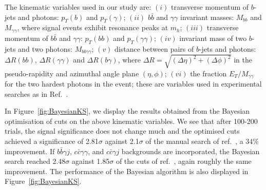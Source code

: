
%


The  kinematic variables used in our  study are:
$(i)$ transverse momentum of $b$-jets and photons: $p_T(b)$ and $p_T(\gamma)$; 
$(ii)$ $b\bar{b}$ and $\gamma\gamma$ invariant masses: $M_{bb}$ and $M_{\gamma\gamma}$, where signal events exhibit resonance peaks at $m_h$;
$(iii)$ transverse momentum of $b\bar{b}$ and $\gamma\gamma$: $p_T(bb)$ and $p_T(\gamma\gamma)$; 
$(iv)$ invariant mass of two $b$-jets and two photons: $M_{bb\gamma\gamma}$;
$(v)$ distance between pairs of $b$-jets and photons: $\Delta R(bb)$, $\Delta R(\gamma\gamma)$ and $\Delta R(b\gamma)$, where
$\Delta R=\sqrt{(\Delta\eta)^2+(\Delta\phi)^2}$ in the pseudo-rapidity and azimuthal angle plane $(\eta,\phi)$;
$(vi)$ the fraction $E_T/M_{\gamma\gamma}$ for the two hardest photons in the event; these are variables used in experimental searches as in Ref.~\cite{Aad:2014yja, CMS}.

In Figure~\ref{fig:BayesianKS}, we display the results obtained from the Bayesian optimisation of cuts on the above kinematic variables. We see that after 100-200 trials, the signal significance does not change much and the optimised cuts achieved a significance of 2.81$\sigma$ against 2.1$\sigma$ of the manual search of ref.~\cite{Azatov:2015oxa}, a 34\% improvement. If $b\bar{b}\gamma j$, $c\bar{c}\gamma\gamma$, and $c\bar{c}\gamma j$ backgrounds are incorporated, the Bayesian search reached 2.48$\sigma$ against 1.85$\sigma$ of the cuts of ref.~\cite{Azatov:2015oxa}, again roughly the same improvement. %
The performance of the Bayesian algorithm is also displayed in Figure~\ref{fig:BayesianKS}.

